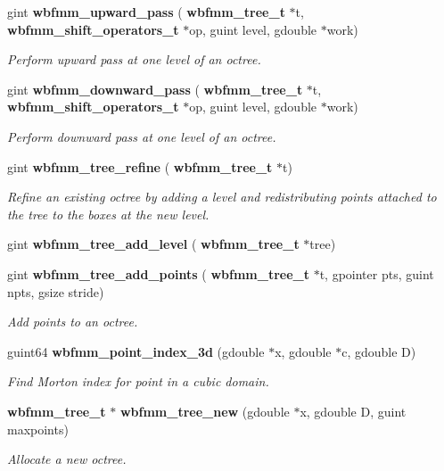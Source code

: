 \begin{DoxyCompactItemize}
gint \textbf{ wbfmm\+\_\+upward\+\_\+pass} (\textbf{ wbfmm\+\_\+tree\+\_\+t} $\ast$t, \textbf{ wbfmm\+\_\+shift\+\_\+operators\+\_\+t} $\ast$op, guint level, gdouble $\ast$work)
\begin{DoxyCompactList}\small\item\em Perform upward pass at one level of an octree. \end{DoxyCompactList}\item 
gint \textbf{ wbfmm\+\_\+downward\+\_\+pass} (\textbf{ wbfmm\+\_\+tree\+\_\+t} $\ast$t, \textbf{ wbfmm\+\_\+shift\+\_\+operators\+\_\+t} $\ast$op, guint level, gdouble $\ast$work)
\begin{DoxyCompactList}\small\item\em Perform downward pass at one level of an octree. \end{DoxyCompactList}\item 
gint \textbf{ wbfmm\+\_\+tree\+\_\+refine} (\textbf{ wbfmm\+\_\+tree\+\_\+t} $\ast$t)
\begin{DoxyCompactList}\small\item\em Refine an existing octree by adding a level and redistributing points attached to the tree to the boxes at the new level. \end{DoxyCompactList}\item 
gint \textbf{ wbfmm\+\_\+tree\+\_\+add\+\_\+level} (\textbf{ wbfmm\+\_\+tree\+\_\+t} $\ast$tree)
\item 
gint \textbf{ wbfmm\+\_\+tree\+\_\+add\+\_\+points} (\textbf{ wbfmm\+\_\+tree\+\_\+t} $\ast$t, gpointer pts, guint npts, gsize stride)
\begin{DoxyCompactList}\small\item\em Add points to an octree. \end{DoxyCompactList}\item 
guint64 \textbf{ wbfmm\+\_\+point\+\_\+index\+\_\+3d} (gdouble $\ast$x, gdouble $\ast$c, gdouble D)
\begin{DoxyCompactList}\small\item\em Find Morton index for point in a cubic domain. \end{DoxyCompactList}\item 
\textbf{ wbfmm\+\_\+tree\+\_\+t} $\ast$ \textbf{ wbfmm\+\_\+tree\+\_\+new} (gdouble $\ast$x, gdouble D, guint maxpoints)
\begin{DoxyCompactList}\small\item\em Allocate a new octree. \end{DoxyCompactList}\item 

\end{DoxyCompactItemize}

